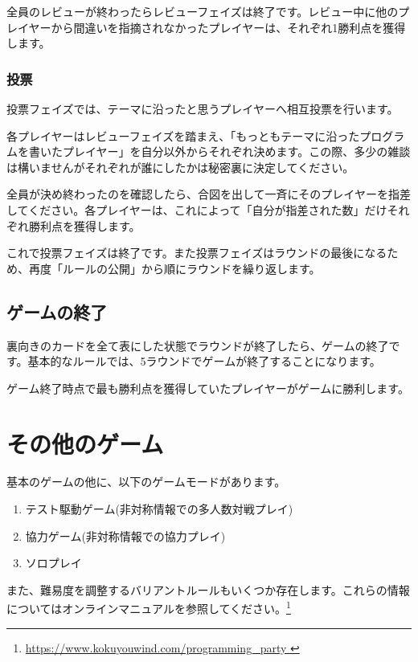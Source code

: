 \documentclass[index]{subfiles}
\begin{document}
全員のレビューが終わったらレビューフェイズは終了です。レビュー中に他のプレイヤーから間違いを指摘されなかったプレイヤーは、それぞれ1勝利点を獲得します。

  \subsubsection{投票} 
  
{\sf 投票フェイズ}では、テーマに沿ったと思うプレイヤーへ相互投票を行います。

各プレイヤーはレビューフェイズを踏まえ、「もっともテーマに沿ったプログラムを書いたプレイヤー」を自分以外からそれぞれ決めます。この際、多少の雑談は構いませんがそれぞれが誰にしたかは秘密裏に決定してください。

全員が決め終わったのを確認したら、合図を出して一斉にそのプレイヤーを指差してください。各プレイヤーは、これによって「自分が指差された数」だけそれぞれ勝利点を獲得します。

これで投票フェイズは終了です。また投票フェイズはラウンドの最後になるため、再度「ルールの公開」から順にラウンドを繰り返します。
 
  \subsection{ゲームの終了}

裏向きのカードを全て表にした状態でラウンドが終了したら、ゲームの終了です。基本的なルールでは、5ラウンドでゲームが終了することになります。

ゲーム終了時点で最も勝利点を獲得していたプレイヤーがゲームに勝利します。

  \section{その他のゲーム}
  \label{sec:game_online_manual}
  
基本のゲームの他に、以下のゲームモードがあります。

\begin{enumerate}
\item テスト駆動ゲーム(非対称情報での多人数対戦プレイ)
\item 協力ゲーム(非対称情報での協力プレイ)
\item ソロプレイ
\end{enumerate}

また、難易度を調整するバリアントルールもいくつか存在します。これらの情報についてはオンラインマニュアルを参照してください。\footnote[1]{ \url{ https://www.kokuyouwind.com/programming_party }}
\end{document}

